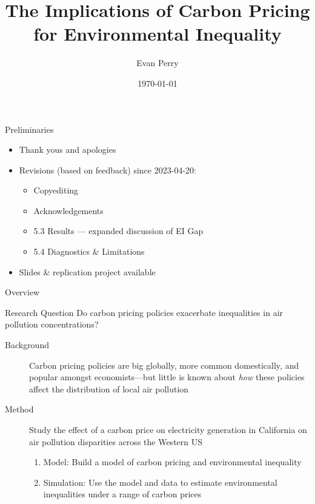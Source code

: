 \documentclass[11pt, aspectratio = 169]{beamer}
\title[Carbon Pricing \& Environmental Inequality]{The Implications of Carbon Pricing\\ for Environmental Inequality}
\author{Evan Perry}
\date{\today}
\begin{document}
\maketitlepage

\begin{frame}{Preliminaries}
    
\begin{itemize}
    \item Thank yous and apologies
    \vfill
    \item Revisions (based on feedback) since 2023-04-20:
    \begin{itemize}
        \item Copyediting
        \item Acknowledgements
        \item 5.3 \quad Results --- expanded discussion of EI Gap
        \item 5.4 \quad Diagnostics \& Limitations
    \end{itemize}
    \vfill
    \item Slides \& replication project available
\end{itemize}


\end{frame}


\begin{frame}{Overview}

\begin{block}{Research Question}
    Do carbon pricing policies exacerbate inequalities in air pollution concentrations?
\end{block}
\vfill

\begin{description}
    \item[Background] Carbon pricing policies are big globally, more common domestically, and popular amongst economists---but little is known about \emph{how} these policies affect the distribution of local air pollution
    \vfill
    \item[Method]  Study the effect of a carbon price on electricity generation in California on air pollution disparities across the Western US
    \begin{enumerate}
        \item Model: Build a model of carbon pricing and environmental inequality
        \item Simulation: Use the model and data to estimate environmental inequalities under a range of carbon prices
    \end{enumerate}
\end{description}
    
\end{frame}
\end{document}
